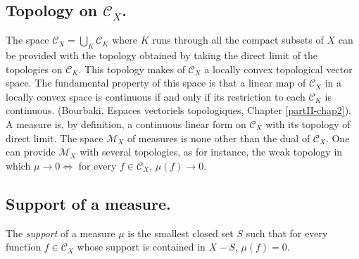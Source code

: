 \subsection{Topology on
$\mathscr{C}_X$.}\label{partII-chap1-sec1.2}%

The space $\mathscr{C}_X = \bigcup\limits_{K} \mathscr{C}_K$ where $K$
runs through all the compact subsets of $X$ can be provided with the
topology obtained by taking the direct limit of the topologies on
$\mathscr{C}_K$. This topology makes of $\mathscr{C}_X$ a locally
convex  topological vector space. The fundamental property of this
space is that a linear map of $\mathscr{C}_X$ in a locally convex
space is continuous if and only if its restriction to each
$\mathscr{C}_K$ is continuous. (Bourbaki, Espaces vectoriels
topologiques, Chapter \ref{partII-chap2}). A measure is, by
definition, a continuous 
linear form on $\mathscr{C}_X$ with its topology of direct limit. The
space $\mathscr{M}_X$ of measures is none other than the dual of
$\mathscr{C}_X$. One can provide  $\mathscr{M}_X$ with several topologies, as
for instance, the weak topology in which $\mu \rightarrow 0
\Leftrightarrow$ for every $f \in \mathscr{C}_X$, $\mu(f)\rightarrow 0$.  

\subsection{Support of a measure.}\label{partII-chap1-sec1.3}%

\begin{defi*}%
 The {\em support} of a measure $\mu$ is the smallest closed set $S$
 such that for every function $f \in  \mathscr{C}_X$ whose support is
 contained in $X-S$, $\mu (f) =0$. 
\end{defi*}


